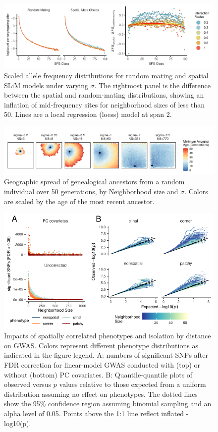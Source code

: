 \documentclass[9pt,twocolumn,twoside,lineno]{gsajnl}
\begin{document}
\begin{figure}[h!]
\centering
\includegraphics[width=\textwidth]{sfs_spatial_v_rm.pdf}
\caption{Scaled allele frequency distributions for random mating and spatial SLiM models under varying $\sigma$. The rightmost panel is the difference between the spatial and random-mating distributions, showing an inflation of mid-frequency sites for neighborhood sizes of less than 50. Lines are a local regression (loess) model at span 2.}
\label{fig:spectrum}
\end{figure}

\begin{figure}[h!]
\centering
\includegraphics[width=\textwidth]{min_ancestor_age_maps.pdf}
\caption{Geographic spread of genealogical ancestors from a random individual over 50 generations, by Neighborhood size and $\sigma$. Colors are scaled by the age of the most recent ancestor.}
\label{fig:spectrum}
\end{figure}

\begin{figure}[h!]
\centering
\includegraphics[width=\textwidth]{gwas_summary_nsig_qqplots.pdf}
\caption{Impacts of spatially correlated phenotypes and isolation by distance on GWAS. Colors represent different phenotype distributions as indicated in the figure legend. A: numbers of significant SNPs after FDR correction for linear-model GWAS conducted with (top) or without (bottom) PC covariates. B: Quantile-quantile plots of observed versus $p$ values relative to those expected from a uniform distribution assuming no effect on phenotypes. The dotted lines show the 95\% confidence region assuming binomial sampling and an alpha level of 0.05. Points above the 1:1 line reflect inflated -log10(p).}
\label{fig:spectrum}
\end{figure}

\newpage



\end{document}
